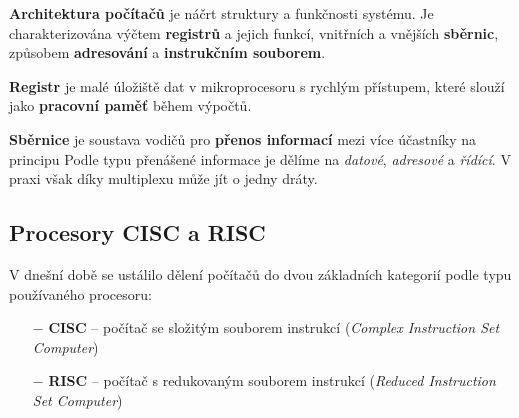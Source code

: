 \textbf{Architektura počítačů} je náčrt struktury a funkčnosti systému. Je charakterizována výčtem \textbf{registrů} a jejich funkcí, vnitřních a vnějších \textbf{sběrnic}, způsobem \textbf{adresování} a \textbf{instrukčním souborem}.

\textbf{Registr} je malé úložiště dat v mikroprocesoru s rychlým přístupem, které slouží jako \textbf{pracovní paměť} během výpočtů.

\textbf{Sběrnice} je soustava vodičů pro \textbf{přenos informací} mezi více účastníky na principu  Podle typu přenášené informace je dělíme na \textit{datové}, \textit{adresové} a \textit{řídící}. V praxi však díky multiplexu může jít o jedny dráty.

\subsection{Procesory CISC a RISC}
V dnešní době se ustálilo dělení počítačů do dvou základních kategorií podle typu používaného procesoru:
\begin{itemize}
	\item[$-$]{\textbf{CISC} -- počítač se složitým souborem instrukcí (\textit{Complex Instruction Set Computer})}
	\item[$-$]{\textbf{RISC} -- počítač s redukovaným souborem instrukcí (\textit{Reduced Instruction Set Computer})}
\end{itemize}

